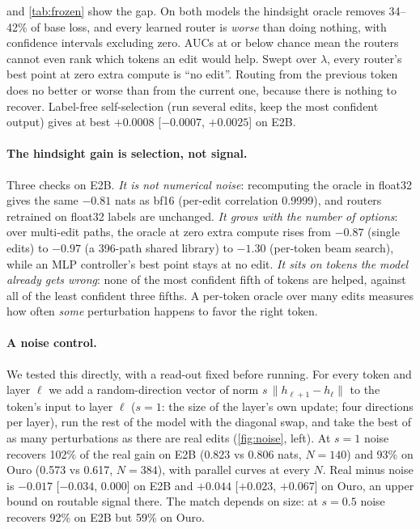 \documentclass[11pt]{article}
\begin{document}
 and \cref{tab:frozen} show the gap. On both models the hindsight oracle removes 34--42\%
of base loss, and every learned router is \emph{worse} than doing nothing, with confidence intervals
excluding zero. AUCs at or below chance mean the routers cannot even rank which tokens an edit would help.
Swept over $\lambda$, every router's best point at zero extra compute is ``no edit''. Routing from the previous
token does no better or worse than from the current one, because there is nothing to recover. Label-free
self-selection (run several edits, keep the most confident output) gives at best $+0.0008$ [$-0.0007$,
$+0.0025$] on E2B.

\paragraph{The hindsight gain is selection, not signal.}
Three checks on E2B. \emph{It is not numerical noise}: recomputing the oracle in float32 gives the same
$-0.81$ nats as bf16 (per-edit correlation 0.9999), and routers retrained on float32 labels are unchanged.
\emph{It grows with the number of options}: over multi-edit paths, the oracle at zero extra compute rises
from $-0.87$ (single edits) to $-0.97$ (a 396-path shared library) to $-1.30$ (per-token beam search), while an
MLP controller's best point stays at no edit. \emph{It sits on tokens the model already gets wrong}: none of
the most confident fifth of tokens are helped, against all of the least confident three fifths. A per-token
oracle over many edits measures how often \emph{some} perturbation happens to favor the right token.

\paragraph{A noise control.}
We tested this directly, with a read-out fixed before running. For every token and layer $\ell$ we add a
random-direction vector of norm $s\,\lVert h_{\ell+1}-h_\ell\rVert$ to the token's input to layer $\ell$
($s=1$: the size of the layer's own update; four directions per layer), run the rest of the model with the
diagonal swap, and take the best of as many perturbations as there are real edits (\cref{fig:noise}, left).
At $s=1$ noise recovers 102\% of the real gain on E2B (0.823 vs 0.806 nats, $N=140$) and 93\% on Ouro
(0.573 vs 0.617, $N=384$), with parallel curves at every $N$. Real minus noise is $-0.017$ [$-0.034$, $0.000$]
on E2B and $+0.044$ [$+0.023$, $+0.067$] on Ouro, an upper bound on routable signal there. The match depends on
size: at $s=0.5$ noise recovers 92\% on E2B but 59\% on Ouro.
\end{document}
